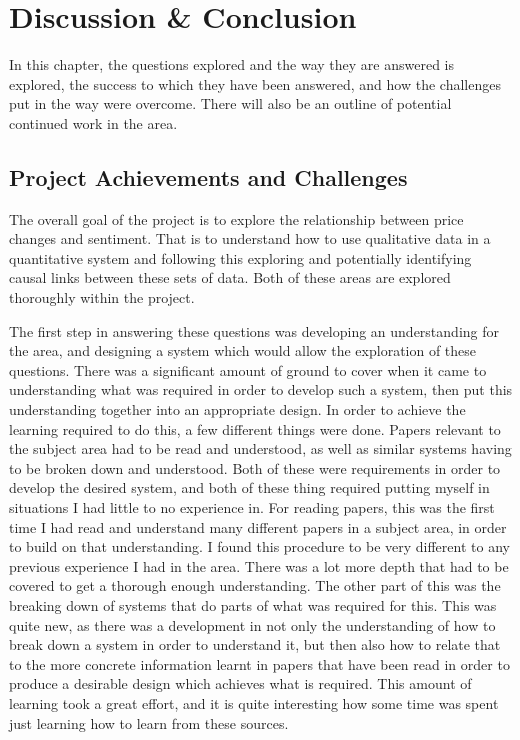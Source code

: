 
\chapter{Discussion \& Conclusion}

In this chapter, the questions explored and the way they are answered is explored, the success to which they have been answered, and how the challenges put in the way were overcome. There will also be an outline of potential continued work in the area.

\section{Project Achievements and Challenges}

The overall goal of the project is to explore the relationship between price changes and sentiment. That is to understand how to use qualitative data in a quantitative system and following this exploring and potentially identifying causal links between these sets of data. Both of these areas are explored thoroughly within the project.

The first step in answering these questions was developing an understanding for the area, and designing a system which would allow the exploration of these questions. There was a significant amount of ground to cover when it came to understanding what was required in order to develop such a system, then put this understanding together into an appropriate design. In order to achieve the learning required to do this, a few different things were done. Papers relevant to the subject area had to be read and understood, as well as similar systems having to be broken down and understood. Both of these were requirements in order to develop the desired system, and both of these thing required putting myself in situations I had little to no experience in. For reading papers, this was the first time I had read and understand many different papers in a subject area, in order to build on that understanding. I found this procedure to be very different to any previous experience I had in the area. There was a lot more depth that had to be covered to get a thorough enough understanding. The other part of this was the breaking down of systems that do parts of what was required for this. This was quite new, as there was a development in not only the understanding of how to break down a system in order to understand it, but then also how to relate that to the more concrete information learnt in papers that have been read in order to produce a desirable design which achieves what is required. This amount of learning took a great effort, and it is quite interesting how some time was spent just learning how to learn from these sources.

